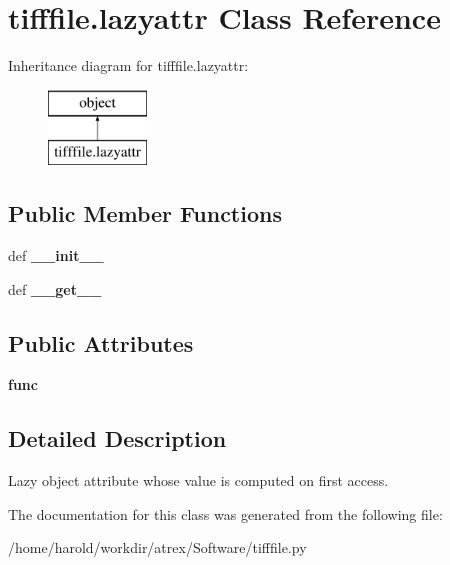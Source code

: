 \hypertarget{classtifffile_1_1lazyattr}{\section{tifffile.\-lazyattr Class Reference}
\label{classtifffile_1_1lazyattr}
}
Inheritance diagram for tifffile.\-lazyattr\-:\begin{figure}[H]
\begin{center}
\leavevmode
\includegraphics[height=2.000000cm]{classtifffile_1_1lazyattr}
\end{center}
\end{figure}
\subsection*{Public Member Functions}
\begin{DoxyCompactItemize}
\item 
\hypertarget{classtifffile_1_1lazyattr_ae6acbd812e166b92c16d5b76dcac5023}{def {\bfseries \-\_\-\-\_\-init\-\_\-\-\_\-}}\label{classtifffile_1_1lazyattr_ae6acbd812e166b92c16d5b76dcac5023}

\item 
\hypertarget{classtifffile_1_1lazyattr_ab4c827b46c8833a1cb92b6282c8a9365}{def {\bfseries \-\_\-\-\_\-get\-\_\-\-\_\-}}\label{classtifffile_1_1lazyattr_ab4c827b46c8833a1cb92b6282c8a9365}

\end{DoxyCompactItemize}
\subsection*{Public Attributes}
\begin{DoxyCompactItemize}
\item 
\hypertarget{classtifffile_1_1lazyattr_a2d8c47f2babd83fd5d0ca2135a63e6a4}{{\bfseries func}}\label{classtifffile_1_1lazyattr_a2d8c47f2babd83fd5d0ca2135a63e6a4}

\end{DoxyCompactItemize}


\subsection{Detailed Description}
\begin{DoxyVerb}Lazy object attribute whose value is computed on first access.\end{DoxyVerb}
 

The documentation for this class was generated from the following file\-:\begin{DoxyCompactItemize}
\item 
/home/harold/workdir/atrex/\-Software/tifffile.\-py\end{DoxyCompactItemize}
